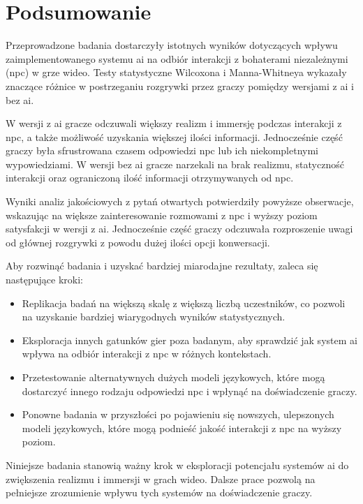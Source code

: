 
\chapter*{Podsumowanie}

Przeprowadzone badania dostarczyły istotnych wyników dotyczących wpływu zaimplementowanego systemu \gls{ai} na odbiór
interakcji z bohaterami niezależnymi (\gls{npc}) w grze wideo. Testy statystyczne Wilcoxona i Manna-Whitneya wykazały
znaczące różnice w postrzeganiu rozgrywki przez graczy pomiędzy wersjami z \gls{ai} i bez \gls{ai}.

W wersji z \gls{ai} gracze odczuwali większy realizm i immersję podczas interakcji z \gls{npc}, a także możliwość uzyskania
większej ilości informacji. Jednocześnie część graczy była sfrustrowana czasem odpowiedzi \gls{npc} lub ich niekompletnymi
wypowiedziami. W wersji bez \gls{ai} gracze narzekali na brak realizmu, statyczność interakcji oraz ograniczoną ilość
informacji otrzymywanych od \gls{npc}.

Wyniki analiz jakościowych z pytań otwartych potwierdziły powyższe obserwacje, wskazując na większe zainteresowanie
rozmowami z \gls{npc} i wyższy poziom satysfakcji w wersji z \gls{ai}. Jednocześnie część graczy odczuwała rozproszenie uwagi
od głównej rozgrywki z powodu dużej ilości opcji konwersacji.

Aby rozwinąć badania i uzyskać bardziej miarodajne rezultaty, zaleca się następujące kroki:

\begin{itemize}
    \item Replikacja badań na większą skalę z większą liczbą uczestników, co pozwoli na uzyskanie bardziej
          wiarygodnych wyników statystycznych.
    \item Eksploracja innych gatunków gier poza badanym, aby sprawdzić jak system \gls{ai} wpływa na odbiór interakcji
          z \gls{npc} w różnych kontekstach.
    \item Przetestowanie alternatywnych dużych modeli językowych, które mogą dostarczyć innego rodzaju odpowiedzi
          \gls{npc} i wpłynąć na doświadczenie graczy.
    \item Ponowne badania w przyszłości po pojawieniu się nowszych, ulepszonych modeli językowych, które mogą
          podnieść jakość interakcji z \gls{npc} na wyższy poziom.
\end{itemize}

Niniejsze badania stanowią ważny krok w eksploracji potencjału systemów \gls{ai} do zwiększenia realizmu i immersji
w grach wideo. Dalsze prace pozwolą na pełniejsze zrozumienie wpływu tych systemów na doświadczenie graczy.